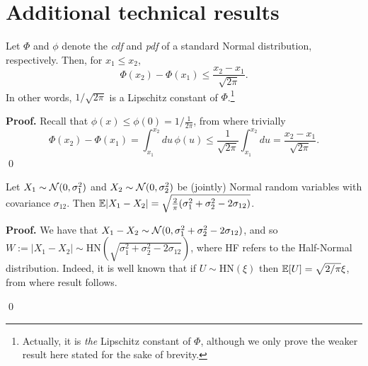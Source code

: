 

\section{Additional technical results}


\begin{lemma} \label{lemma:lipschitz}
	Let $\Phi$ and $\phi$ denote the \textit{cdf} and \textit{pdf} of a standard Normal distribution, respectively. Then, for $x_1 \leq x_2$,
	\begin{equation*}
		\Phi(x_2) - \Phi(x_1) \leq \frac{x_2 - x_1}{\sqrt{2 \pi}}.
	\end{equation*}
	In other words, $1/\sqrt{2 \pi}$ is a Lipschitz constant of $\Phi$.\footnote{Actually, it is \textit{the} Lipschitz constant of $\Phi$, although we only prove the weaker result here stated for the sake of brevity.}
\end{lemma}


\textbf{Proof. \hspace{0.05cm}} Recall that $\phi(x) \leq \phi(0) = 1 / \frac{1}{2\pi}$, from where trivially
\begin{equation*}
	\Phi(x_2) - \Phi(x_1) = \int_{x_1}^{x_2} du \, \phi(u) \leq \frac{1}{\sqrt{2 \pi}} \int_{x_1}^{x_2} du = \frac{x_2 - x_1}{\sqrt{2 \pi}}.
\end{equation*}
\qed



\begin{lemma} \label{lemma:halfnormal}
	Let $X_1 \sim \mathcal{N}(0, \sigma_1^2)$ and $X_2 \sim \mathcal{N}(0, \sigma_2^2)$ be (jointly) Normal random variables with covariance $\sigma_{12}$. Then $\mathbb{E} |X_1 - X_2| = \sqrt{\frac{2}{\pi} (\sigma_1^2 + \sigma_2^2 - 2\sigma_{12})}$.
\end{lemma}

\textbf{Proof. \hspace{0.05cm}} We have that $X_1 - X_2 \sim \mathcal{N}(0, \sigma_1^2 + \sigma_2^2 - 2\sigma_{12})$, and so $W := |X_1 - X_2| \sim \mathrm{HN} (\sqrt{\sigma_1^2 + \sigma_2^2 - 2\sigma_{12}})$, where HF refers to the Half-Normal distribution. Indeed, it is well known that if $U \sim \mathrm{HN} (\xi)$ then $\mathbb{E}[U] = \sqrt{2 / \pi} \xi$, from where result follows.

\qed

